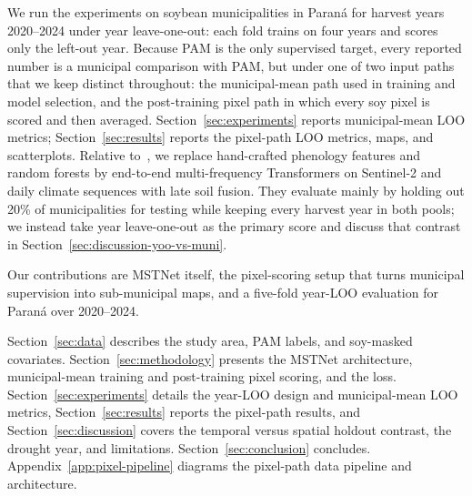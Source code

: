 We run the experiments on soybean municipalities in Paran\'{a} for harvest years 2020--2024 under year leave-one-out: each fold trains on four years and scores only the left-out year.
Because PAM is the only supervised target, every reported number is a municipal comparison with PAM, but under one of two input paths that we keep distinct throughout:
the municipal-mean path used in training and model selection, and the post-training pixel path in which every soy pixel is scored and then averaged.
Section~\ref{sec:experiments} reports municipal-mean LOO metrics; Section~\ref{sec:results} reports the pixel-path LOO metrics, maps, and scatterplots.
Relative to~\citet{song2022soy}, we replace hand-crafted phenology features and random forests by end-to-end multi-frequency Transformers on Sentinel-2 and daily climate sequences with late soil fusion.
They evaluate mainly by holding out 20\% of municipalities for testing while keeping every harvest year in both pools; we instead take year leave-one-out as the primary score and discuss that contrast in Section~\ref{sec:discussion-yoo-vs-muni}.

Our contributions are MSTNet itself, the pixel-scoring setup that turns municipal supervision into sub-municipal maps, and a five-fold year-LOO evaluation for Paran\'{a} over 2020--2024.

Section~\ref{sec:data} describes the study area, PAM labels, and soy-masked covariates.
Section~\ref{sec:methodology} presents the MSTNet architecture, municipal-mean training and post-training pixel scoring, and the loss.
Section~\ref{sec:experiments} details the year-LOO design and municipal-mean LOO metrics, Section~\ref{sec:results} reports the pixel-path results, and Section~\ref{sec:discussion} covers the temporal versus spatial holdout contrast, the drought year, and limitations.
Section~\ref{sec:conclusion} concludes.
Appendix~\ref{app:pixel-pipeline} diagrams the pixel-path data pipeline and architecture.
